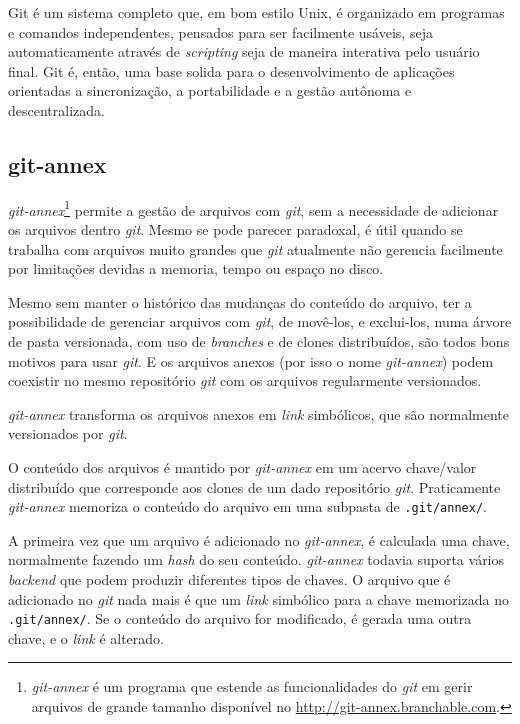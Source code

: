 Git é um sistema completo que, em bom estilo Unix, é organizado em
programas e comandos independentes, pensados para ser facilmente
usáveis, seja automaticamente através de \emph{scripting} seja de
maneira interativa pelo usuário final. Git é, então, uma base solida
para o desenvolvimento de aplicações orientadas a sincronização, a
portabilidade e a gestão autônoma e descentralizada. 

\subsection{git-annex}\label{git-annex}
\emph{git-annex}\footnote{\emph{git-annex} é um programa que estende
  as funcionalidades do \emph{git} em gerir arquivos de grande tamanho
disponível no \url{http://git-annex.branchable.com}.} permite a
gestão de arquivos com \emph{git}, sem a necessidade de adicionar os
arquivos dentro \emph{git}. Mesmo se pode parecer paradoxal, é útil
quando se trabalha com arquivos muito grandes que \emph{git}
atualmente não gerencia facilmente por limitações devidas a memoria,
tempo ou espaço no disco.

Mesmo sem manter o histórico das mudanças do conteúdo do arquivo, ter
a possibilidade de gerenciar arquivos com \emph{git}, de movê-los, e
exclui-los, numa árvore de pasta versionada, com uso de
\emph{branches} e de clones distribuídos, são todos bons motivos para
usar \emph{git}. E os arquivos anexos (por isso o nome
\emph{git-annex}) podem coexistir no mesmo repositório \emph{git} com
os arquivos regularmente versionados. 

\emph{git-annex} transforma os arquivos anexos em \emph{link}
simbólicos, que são normalmente versionados por \emph{git}. 

O conteúdo dos arquivos é mantido por \emph{git-annex} em um acervo
chave/valor distribuído que corresponde aos clones de um dado
repositório \emph{git}. Praticamente \emph{git-annex} memoriza o
conteúdo do arquivo em uma subpasta de \verb|.git/annex/|.

A primeira vez que um arquivo é adicionado no \emph{git-annex}, é
calculada uma chave, normalmente fazendo um \emph{hash} do seu
conteúdo. \emph{git-annex} todavia suporta vários \emph{backend} que
podem produzir diferentes tipos de chaves. O arquivo que é adicionado
no \emph{git} nada mais é que um \emph{link} simbólico para a chave
memorizada no \verb|.git/annex/|. Se o conteúdo do arquivo for
modificado, é gerada uma outra chave, e o \emph{link} é alterado. 

